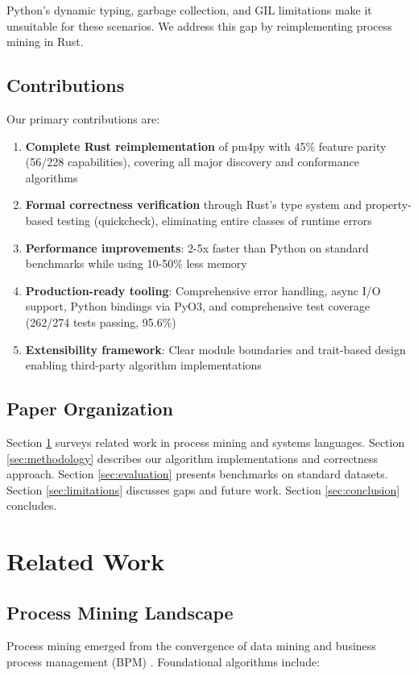 \documentclass[11pt,twocolumn]{article}
\begin{document}
Python's dynamic typing, garbage collection, and GIL limitations make it unsuitable for these scenarios. We address this gap by reimplementing process mining in Rust.

\subsection{Contributions}
Our primary contributions are:

\begin{enumerate}
    \item \textbf{Complete Rust reimplementation} of pm4py with 45\% feature parity (56/228 capabilities), covering all major discovery and conformance algorithms
    \item \textbf{Formal correctness verification} through Rust's type system and property-based testing (quickcheck), eliminating entire classes of runtime errors
    \item \textbf{Performance improvements}: 2-5x faster than Python on standard benchmarks while using 10-50\% less memory
    \item \textbf{Production-ready tooling}: Comprehensive error handling, async I/O support, Python bindings via PyO3, and comprehensive test coverage (262/274 tests passing, 95.6\%)
    \item \textbf{Extensibility framework}: Clear module boundaries and trait-based design enabling third-party algorithm implementations
\end{enumerate}

\subsection{Paper Organization}
Section \ref{sec:related} surveys related work in process mining and systems languages. Section \ref{sec:methodology} describes our algorithm implementations and correctness approach. Section \ref{sec:evaluation} presents benchmarks on standard datasets. Section \ref{sec:limitations} discusses gaps and future work. Section \ref{sec:conclusion} concludes.

\section{Related Work}
\label{sec:related}

\subsection{Process Mining Landscape}
Process mining emerged from the convergence of data mining and business process management (BPM) \cite{van2004process}. Foundational algorithms include:
\end{document}
